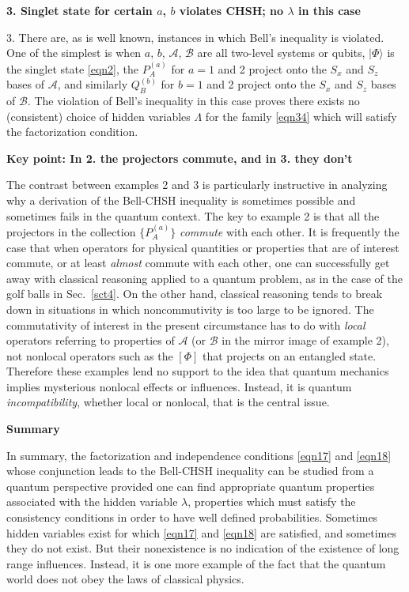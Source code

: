 \documentclass[12pt]{article} %
\def\outl#1{\par{\medskip\noindent\hspace*{.5cm}\bf
      \mathversion{bold}#1\mathversion{normal}\smallskip} }
\def\np{} \def\xa{} \def\xb{} \def\xn{} \def\xp{}
\def\outl#1{} \def\np{} \def\xa{} \def\xb{} \def\xn{} \def\xp{}
\def\outl#1{\par{\medskip\noindent\hspace*{.5cm}\bf
      \mathversion{bold}#1\mathversion{normal}\smallskip} }
\def\np{\newpage }\def\xn{\nopagebreak }\def\xp{\pagebreak }
\newcommand{\ket}[1]{|#1\rgl }
\newcommand{\rgl}{\rangle }
\newcommand{\AM}{{\mathcal A}}
\newcommand{\BM}{{\mathcal B}}
\newcommand{\lm}{\lambda }
\newcommand{\Lm}{\Lambda }
\begin{document}
\xb
\outl{3. Singlet state for certain $a$, $b$ violates CHSH; no $\lm$ in this
  case} 
\xa


3. There are, as is well known, instances in which Bell's inequality is
violated.  One of the simplest is when $a$, $b$, $\AM$, $\BM$ are all
two-level systems or qubits, $\ket{\Phi}$ is the singlet state \eqref{eqn2},
the $P^{(a)}_A$ for $a=1$ and 2 project onto the $S_x$ and $S_z$ bases of
$\AM$, and similarly $Q^{(b)}_B$ for $b=1$ and 2 project onto the $S_x$ and
$S_z$ bases of $\BM$. The violation of Bell's inequality in this case proves
there exists no (consistent) choice of hidden variables $\Lm$ for the family
\eqref{eqn34} which will satisfy the factorization condition.

\xb
\outl{Key point: In 2. the projectors commute, and in 3. they don't}
\xa


The contrast between examples 2 and 3 is particularly instructive in analyzing
why a derivation of the Bell-CHSH inequality is sometimes possible and
sometimes fails in the quantum context.  The key to example 2 is that all the
projectors in the collection $\{P^{(a)}_A\}$ \emph{commute} with each other.
It is frequently the case that when operators for physical quantities or
properties that are of interest commute, or at least \emph{almost} commute
with each other, one can successfully get away with classical reasoning
applied to a quantum problem, as in the case of the golf balls in
Sec.~\ref{sct4}. On the other hand, classical reasoning tends to break down in
situations in which noncommutivity is too large to be ignored.  The
commutativity of interest in the present circumstance has to do with
\emph{local} operators referring to properties of $\AM$ (or $\BM$ in the
mirror image of example 2), not nonlocal operators such as the $[\Phi]$ that
projects on an entangled state.  Therefore these examples lend no support to
the idea that quantum mechanics implies mysterious nonlocal effects or
influences.  Instead, it is quantum \emph{incompatibility}, whether local or
nonlocal, that is the central issue.

\xb
\outl{Summary}
\xa



In summary, the factorization and independence conditions \eqref{eqn17} and
\eqref{eqn18} whose conjunction leads to the Bell-CHSH inequality can be
studied from a quantum perspective provided one can find appropriate quantum
properties associated with the hidden variable $\lm$, properties which must
satisfy the consistency conditions in order to have well defined
probabilities. Sometimes hidden variables exist for which \eqref{eqn17} and
\eqref{eqn18} are satisfied, and sometimes they do not exist.  But their
nonexistence is no indication of the existence of long range influences.
Instead, it is one more example of the fact that the quantum world does not
obey the laws of classical physics.
\end{document}
